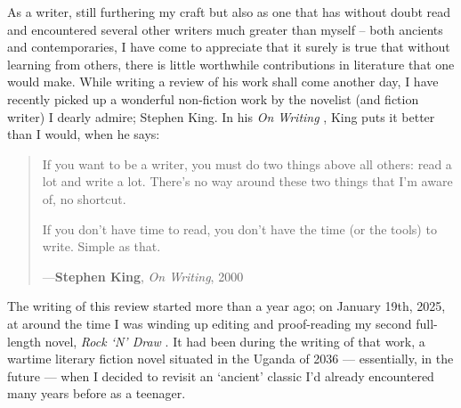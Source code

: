 \documentclass[a4paper]{article}
\begin{document}
As a writer, still furthering my craft but also as one that has without doubt read and encountered several other writers much greater than myself – both ancients and contemporaries, I have come to appreciate that it surely is true that without learning from others, there is little worthwhile contributions in literature that one would make. While writing a review of his work shall come another day, I have recently picked up a wonderful non-fiction work by the novelist (and fiction writer) I dearly admire; Stephen King. In his \textit{On Writing} \cite{King2000}, King puts it better than I would, when he says:



\noindent
\begin{minipage}{1\textwidth}
\vspace{1em}
\begin{quotation}
{\ttfamily

If you want to be a writer, you must do two things above all others: read a lot and write a lot. There's no way around these two things that I'm aware of, no shortcut.

\vspace{1em}

If you don't have time to read, you don't have the time (or the tools) to write. Simple as that.

}
\hspace*{\fill} ---\textbf{Stephen King}, \textit{On Writing}, 2000\cite{King2000}
\end{quotation}
\vspace{1em}
\end{minipage}


The writing of this review started more than a year ago; on January 19th, 2025, at around the time I was winding up editing and proof-reading my second full-length novel, \textit{Rock `N' Draw} \cite{lutalo2025rock}. It had been during the writing of that work, a wartime literary fiction novel situated in the Uganda of 2036 --- essentially, in the future --- when I decided to revisit an `ancient' classic I'd already encountered many years before as a teenager. 
\end{document}
